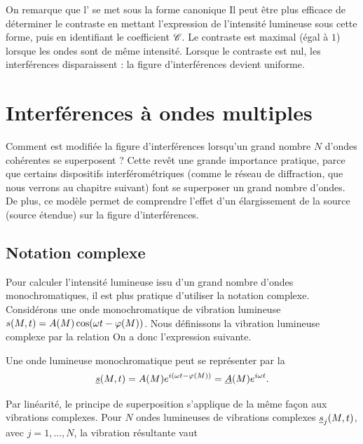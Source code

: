 \documentclass[12pt,fancy]{cours}
\begin{document}
\begin{remarque}
  
  On remarque que l' se met sous la forme canonique
  Il peut être plus efficace de déterminer le contraste en mettant l'expression de l'intensité lumineuse sous cette forme, puis en identifiant le coefficient $\mathcal{C}$.
  Le contraste est maximal (égal à $1$) lorsque les ondes sont de même intensité. Lorsque le contraste est nul, les interférences disparaissent : la figure d'interférences devient uniforme.
\end{remarque}




\section{Interférences à ondes multiples}

Comment est modifiée la figure d'interférences lorsqu'un grand nombre $N$ d'ondes cohérentes se superposent ? Cette revêt une grande importance pratique, parce que certains dispositifs interférométriques (comme le réseau de diffraction, que nous verrons au chapitre suivant) font se superposer un grand nombre d'ondes. De plus, ce modèle permet de comprendre l'effet d'un élargissement de la source (source étendue) sur la figure d'interférences.

\subsection{Notation complexe}

Pour calculer l'intensité lumineuse issu d'un grand nombre d'ondes monochromatiques, il est plus pratique d'utiliser la notation complexe. Considérons une onde monochromatique de vibration lumineuse $s(M,t) = A(M) \cos(\omega t - \varphi(M))$. Nous définissons la vibration lumineuse complexe par la relation 
On a donc l'expression suivante.
\begin{definition}
  Une onde lumineuse monochromatique peut se représenter par la  
  $$
  \underline{s}(M,t) = A(M) e^{i(\omega t - \varphi(M))} = \underline{A}(M) e^{i\omega t}.
  $$
\end{definition}
Par linéarité, le principe de superposition s'applique de la même façon aux vibrations complexes. Pour $N$ ondes lumineuses de vibrations complexes $\underline{s}_j(M,t)$, avec $j=1,...,N$, la vibration résultante vaut
\end{document}
